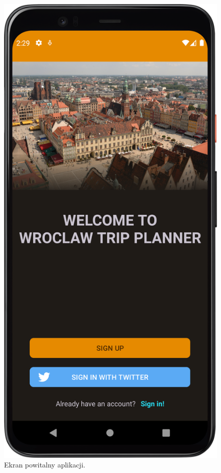         \vspace{1cm}
        \begin{figure}[!ht]%
            \centering
            \includegraphics[scale=0.09]{src/app/welcome_fragment.png}
            \caption{Ekran powitalny aplikacji.\label{welcome}}
            \qquad
        \end{figure} 

